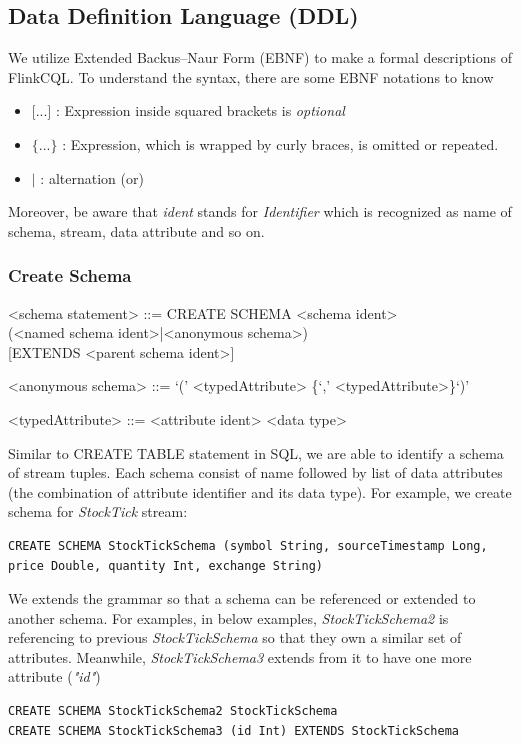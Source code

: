 \subsection{Data Definition Language (DDL)}
We utilize Extended Backus–Naur Form (EBNF) to make a formal descriptions of FlinkCQL. To understand the syntax, there are some EBNF notations to know
\begin{itemize}
	\item $\textbf{[...]}$ : Expression inside squared brackets is \textit{optional}
	\item $\textbf{\{...\}}$ : Expression, which is wrapped by curly braces, is omitted or repeated. 
	\item $\textbf{|}$ : alternation (or)
\end{itemize} 
Moreover, be aware that \textit{ident} stands for \textit{Identifier} which is recognized as name of schema, stream, data attribute and so on.
\newpage
\subsubsection{Create Schema}

\setlength{\grammarindent}{12em} %

\begin{grammar}

<schema statement> ::= CREATE SCHEMA <schema ident> \\
(<named schema ident>|<anonymous schema>) \\
  { }[EXTENDS <parent schema ident>]

<anonymous schema> ::= `(' <typedAttribute> \{`,' <typedAttribute>\}`)'

<typedAttribute> ::= <attribute ident> <data type>

\end{grammar}
	
Similar to CREATE TABLE statement in SQL, we are able to identify a schema of stream tuples. Each schema consist of name followed by list of data attributes (the combination of attribute identifier and its data type). For example, we create schema for \textit{StockTick} stream:
\begin{verbatim}
CREATE SCHEMA StockTickSchema (symbol String, sourceTimestamp Long, 
price Double, quantity Int, exchange String)
\end{verbatim}

We extends the grammar so that a schema can be referenced or extended to another schema. For examples, in below examples, \textit{StockTickSchema2} is referencing to previous \textit{StockTickSchema} so that they own a similar set of attributes. Meanwhile, \textit{StockTickSchema3} extends from it to have one more attribute (\textit{"id"})
\begin{verbatim}
CREATE SCHEMA StockTickSchema2 StockTickSchema
CREATE SCHEMA StockTickSchema3 (id Int) EXTENDS StockTickSchema
\end{verbatim}

